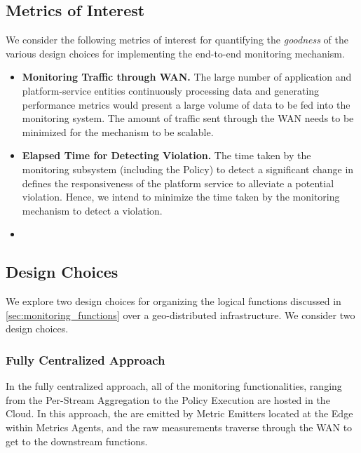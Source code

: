 \subsection{Metrics of Interest}
We consider the following metrics of interest for quantifying the \textit{goodness} of the various design choices for implementing the end-to-end monitoring mechanism.
\begin{itemize}
\item \textbf{Monitoring Traffic through WAN. } The large number of application and platform-service entities continuously processing data and generating performance metrics would present a large volume of data to be fed into the monitoring system. The amount of traffic sent through the WAN needs to be minimized for the mechanism to be scalable.
\item \textbf{Elapsed Time for Detecting Violation. }The time taken by the monitoring subsystem (including the Policy) to detect a significant change in  defines the responsiveness of the platform service to alleviate a potential violation. Hence, we intend to minimize the time taken by the monitoring mechanism to detect a violation.
\item {}
\end{itemize}


\subsection{Design Choices}
We explore two design choices for organizing the logical functions discussed in \cref{sec:monitoring_functions} over a geo-distributed infrastructure. We consider two design choices.

\subsubsection{Fully Centralized Approach}
In the fully centralized approach, all of the monitoring functionalities, ranging from the Per-Stream Aggregation to the Policy Execution are hosted in the Cloud. In this approach, the  are emitted by Metric Emitters located at the Edge within Metrics Agents, and the raw measurements traverse through the WAN to get to the downstream functions. 

